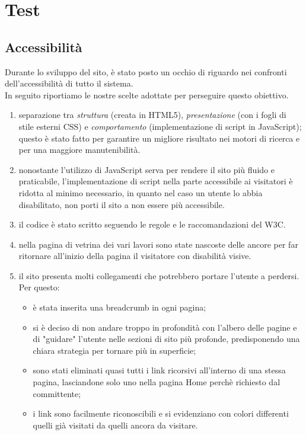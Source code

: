 \section{Test}
\subsection{Accessibilità}
Durante lo sviluppo del sito, è stato posto un occhio di riguardo nei confronti dell'accessibilità di tutto il sistema.\\In seguito riportiamo le nostre scelte adottate per perseguire questo obiettivo.
\begin{enumerate}
	\item separazione tra \textit{struttura} (creata in HTML5), \textit{presentazione} (con i fogli di stile esterni CSS) e \textit{comportamento} (implementazione di script in JavaScript); \\questo è stato fatto per garantire un migliore risultato nei motori di ricerca e per una maggiore manutenibilità.	
	\item nonostante l'utilizzo di JavaScript serva per rendere il sito più fluido e praticabile, l'implementazione di script nella parte accessibile ai visitatori è ridotta al minimo necessario, in quanto nel caso un utente lo abbia disabilitato, non porti il sito a non essere più accessibile.
	\item il codice è stato scritto seguendo le regole e le raccomandazioni del W3C. 
	\item nella pagina di vetrina dei vari lavori sono state nascoste delle ancore per far ritornare all'inizio della pagina il visitatore con disabilità visive.
	\item il sito presenta molti collegamenti che potrebbero portare l'utente a perdersi. Per questo: 
	\begin{itemize}
	\item è stata inserita una breadcrumb in ogni pagina;
	\item si è deciso di non andare troppo in profondità con l'albero delle pagine e di "guidare" l'utente nelle sezioni di sito più profonde, predisponendo una chiara strategia per tornare più in superficie;
	\item sono stati eliminati quasi tutti i link ricorsivi all'interno di una stessa pagina, lasciandone solo uno nella pagina Home perchè richiesto dal committente; 
	\item i link sono facilmente riconoscibili e si evidenziano con colori differenti quelli già visitati da quelli ancora da visitare.

\end{itemize}
\end{enumerate}

